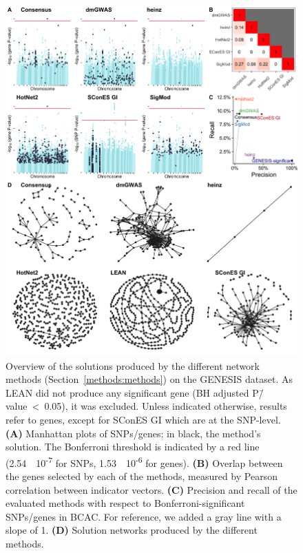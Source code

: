 \documentclass[twocolumn, 11pt]{article}
\begin{document}
\begin{figure}[htbp]
  \centering
  \includegraphics[height=.75\textheight]{./figures/figure_1.png}
  \caption{Overview of the solutions produced by the different network methods (Section~\ref{methods:methods}) on the GENESIS dataset. As LEAN did not produce any significant gene (BH adjusted P\=/value~<~0.05), it was excluded. Unless indicated otherwise, results refer to genes, except for SConES GI which are at the SNP-level. \textbf{(A)} Manhattan plots of SNPs/genes; in black, the method's solution. The Bonferroni threshold is indicated by a red line (2.54~\texttimes{}~10\textsuperscript{-7} for SNPs, 1.53~\texttimes{}~10\textsuperscript{-6} for genes). \textbf{(B)} Overlap between the genes selected by each of the methods, measured by Pearson correlation between indicator vectors. \textbf{(C)} Precision and recall of the evaluated methods with respect to Bonferroni-significant SNPs/genes in BCAC. For reference, we added a gray line with a slope of 1. \textbf{(D)} Solution networks produced by the different methods.}
  \label{fig:solution_overview}
\end{figure}
\end{document}
